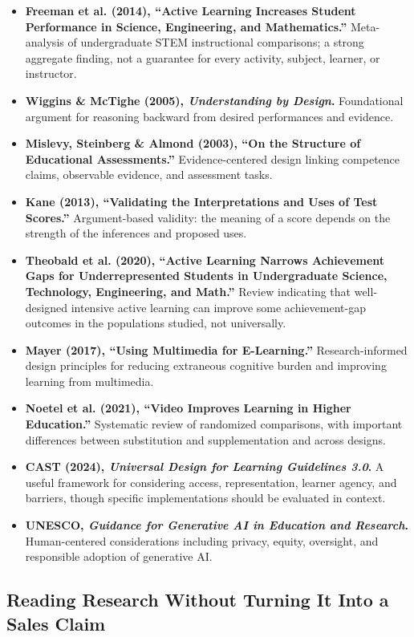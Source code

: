 \begin{itemize}
    \item \textbf{Freeman et al. (2014), ``Active Learning Increases Student Performance in Science, Engineering, and Mathematics.''} Meta-analysis of undergraduate STEM instructional comparisons; a strong aggregate finding, not a guarantee for every activity, subject, learner, or instructor.
    \item \textbf{Wiggins \& McTighe (2005), \emph{Understanding by Design}.} Foundational argument for reasoning backward from desired performances and evidence.
    \item \textbf{Mislevy, Steinberg \& Almond (2003), ``On the Structure of Educational Assessments.''} Evidence-centered design linking competence claims, observable evidence, and assessment tasks.
    \item \textbf{Kane (2013), ``Validating the Interpretations and Uses of Test Scores.''} Argument-based validity: the meaning of a score depends on the strength of the inferences and proposed uses.
    \item \textbf{Theobald et al. (2020), ``Active Learning Narrows Achievement Gaps for Underrepresented Students in Undergraduate Science, Technology, Engineering, and Math.''} Review indicating that well-designed intensive active learning can improve some achievement-gap outcomes in the populations studied, not universally.
    \item \textbf{Mayer (2017), ``Using Multimedia for E-Learning.''} Research-informed design principles for reducing extraneous cognitive burden and improving learning from multimedia.
    \item \textbf{Noetel et al. (2021), ``Video Improves Learning in Higher Education.''} Systematic review of randomized comparisons, with important differences between substitution and supplementation and across designs.
    \item \textbf{CAST (2024), \emph{Universal Design for Learning Guidelines 3.0}.} A useful framework for considering access, representation, learner agency, and barriers, though specific implementations should be evaluated in context.
    \item \textbf{UNESCO, \emph{Guidance for Generative AI in Education and Research}.} Human-centered considerations including privacy, equity, oversight, and responsible adoption of generative AI.
\end{itemize}

\subsection*{Reading Research Without Turning It Into a Sales Claim}

